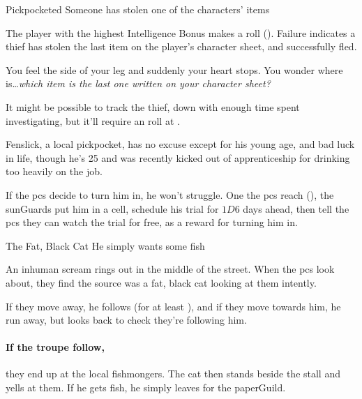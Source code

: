 \label{randommeetings}

{Pickpocketed}%
{Someone has stolen one of the characters' items}%

The player with the highest Intelligence Bonus makes a  roll (\tn[9]).
Failure indicates a thief has stolen the last item on the player's character sheet, and successfully fled.

\begin{boxtext}
  You feel the side of your leg and suddenly your heart stops.
  You wonder where is\ldots \textit{which item is the last one written on your character sheet?}

\end{boxtext}


It might be possible to track the thief, down with enough time spent investigating, but it'll require an  roll at \tn[13].

Fenslick, a local pickpocket, has no excuse except for his young age, and bad luck in life, though he's 25 and was recently kicked out of  apprenticeship for drinking too heavily on the job.

If the \glspl{pc} decide to turn him in, he won't struggle.
One the \glspl{pc} reach  (), the \glspl{sunGuard} put him in a cell, schedule his trial for $1D6$ days ahead, then tell the \glspl{pc} they can watch the trial for free, as a reward for turning him in.

{The Fat, Black Cat}%
{He simply wants some fish}%

An inhuman scream rings out in the middle of the street.
When the \glspl{pc} look about, they find the source was a fat, black cat looking at them intently.

If they move away, he follows (for at least ), and if they move towards him, he run away, but looks back to check they're following him.

\paragraph{If the troupe follow,}
they end up at the local fishmongers.
The cat then stands beside the stall and yells at them.
If he gets fish, he simply leaves for the \gls{paperGuild}.

